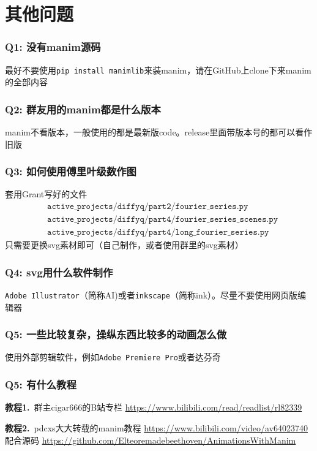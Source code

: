 \documentclass[UTF8]{ctexart}
\begin{document}
\section{其他问题}
\subsubsection*{Q1: 没有manim源码}
最好不要使用\texttt{pip install manimlib}来装manim，请在GitHub上clone下来manim的全部内容

\subsubsection*{Q2: 群友用的manim都是什么版本}
manim不看版本，一般使用的都是最新版code。release里面带版本号的都可以看作旧版

\subsubsection*{Q3: 如何使用傅里叶级数作图}
套用Grant写好的文件
\begin{align*}
&\texttt{active\_projects/diffyq/part2/fourier\_series.py}\\
&\texttt{active\_projects/diffyq/part4/fourier\_series\_scenes.py}\\
&\texttt{active\_projects/diffyq/part4/long\_fourier\_series.py}
\end{align*}
只需要更换svg素材即可（自己制作，或者使用群里的svg素材）

\subsubsection*{Q4: svg用什么软件制作}
\texttt{Adobe Illustrator}（简称AI)或者\texttt{inkscape}（简称ink）。尽量不要使用网页版编辑器

\subsubsection*{Q5: 一些比较复杂，操纵东西比较多的动画怎么做}
使用外部剪辑软件，例如\texttt{Adobe Premiere Pro}或者达芬奇

\subsubsection*{Q5: 有什么教程}
\textbf{教程1.}\ 群主cigar666的B站专栏
\url{https://www.bilibili.com/read/readlist/rl82339}

\textbf{教程2.}\ pdcxs大大转载的manim教程
\url{https://www.bilibili.com/video/av64023740}配合源码
\url{https://github.com/Elteoremadebeethoven/AnimationsWithManim}
\end{document}
